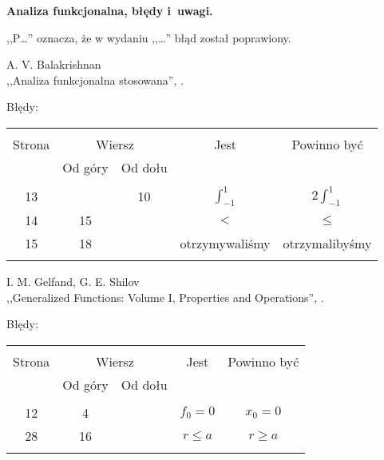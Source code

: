 \documentclass[a4paper,11pt]{article}
\newcommand{\tb}{\textbf}
\newcommand{\Field}[1]{ \begin{center} {\Large \tb{#1} } \end{center} }
\newcommand{\Work}[1]{ \begin{center} {\large #1} \end{center} }
\begin{document}
\Field{Analiza funkcjonalna, błędy i~uwagi.}

,,P\ldots'' oznacza, że w wydaniu ,,\ldots'' błąd został poprawiony.\\



\Work{ A. V. Balakrishnan \\
  ,,Analiza funkcjonalna stosowana'', \cite{Bal92}. }


Błędy:\\
\begin{center}
  \begin{tabular}{|c|c|c|c|c|}
    \hline
    & \multicolumn{2}{c|}{} & & \\
    Strona & \multicolumn{2}{c|}{Wiersz}& Jest & Powinno być \\ \cline{2-3}
    & Od góry & Od dołu &  &  \\ \hline
    & & & & \\
    13 & & 10 & $\int^{ 1 }_{ -1 }$ & $2 \int^{ 1 }_{ -1 }$ \\
    14 & 15 & & $<$ & $\leq$ \\
    15 & 18 & & otrzymywaliśmy & otrzymalibyśmy \\
    & & & & \\ \hline
  \end{tabular}
\end{center}

\Work{I. M. Gelfand, G. E. Shilov \\
  ,,Generalized Functions: Volume I, Properties and Operations'',
  \cite{GS64}. }


Błędy:\\
\begin{center}
  \begin{tabular}{|c|c|c|c|c|}
    \hline
    & \multicolumn{2}{c|}{} & & \\
    Strona & \multicolumn{2}{c|}{Wiersz}& Jest & Powinno być \\ \cline{2-3}
    & Od góry & Od dołu &  &  \\ \hline
    & & & & \\
    12 & 4 & & $f_{ 0 } = 0$ & $x_{ 0 } = 0$ \\
    28 & 16 & & $r \leq a$ & $r \geq a$ \\
    & & & & \\ \hline
  \end{tabular}
\end{center}
\end{document}
